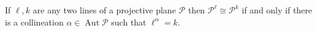 If $\ell, k$ are any two lines of a projective plane $\mathcal{P}$ then $\mathcal{P}^\ell \cong \mathcal{P}^k$ if and only if there is a collineation $\alpha \in \operatorname{Aut}\mathcal{P}$ such that $\ell^\alpha = k$.
